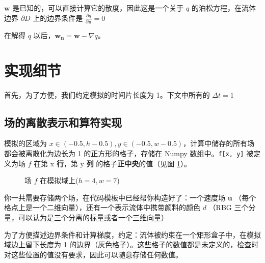 \documentclass{ctexart}
\begin{document}
$\mathbf{w}$ 是已知的，可以直接计算它的散度，因此这是一个关于 $q$ 的泊松方程，在流体边界 $\partial D$ 上的边界条件是 $\frac{\partial q}{\partial \mathbf{n}} = 0$

在解得 $q$ 以后，$\mathbf{w_n} = \mathbf{w} - \nabla q$。

\section{实现细节}

首先，为了方便，我们约定模拟的时间片长度为 1。下文中所有的 $\Delta t = 1$

\subsection{场的离散表示和算符实现}

模拟的区域为 $x \in (-0.5, h-0.5), y \in (-0.5, w-0.5)$，计算中储存的所有场都会被离散化为边长为 1 的正方形的格子，存储在 Numpy 数组中。\texttt{f[x, y]} 被定义为场 $f$ 在第 x \textbf{行}，第 y \textbf{列} 的格子\textbf{正中央}的值（见图 \ref{fig:grid}）。

\begin{figure}[h!]
  \label{fig:grid}
  \centering

  \caption{场 $f$ 在模拟域上($h = 4, w = 7$)}
\end{figure}

你一共需要存储两个场，在代码模板中已经帮你构造好了：一个速度场 $\mathbf{u}$ （每个格点上是一个二维向量），还有一个表示流体中携带颜料的颜色 $d$ （RBG 三个分量，可以认为是三个分离的标量或者一个三维向量）

为了方便描述边界条件和计算梯度，约定：流体被约束在一个矩形盒子中，在模拟域边上留下长度为 1 的边界（灰色格子）。这些格子的数值都是未定义的，检查时对这些位置的值没有要求，因此可以随意存储任何数值。
\end{document}
